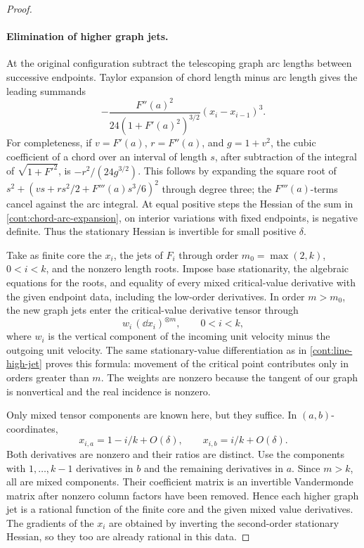 \begin{proof}
\paragraph{Elimination of higher graph jets.}
At the original configuration subtract the telescoping graph
arc lengths between successive endpoints.  Taylor expansion of
chord length minus arc length gives the leading summands
\begin{equation}
 -\frac{F''(a)^2}{24(1+F'(a)^2)^{3/2}}
       (x_i-x_{i-1})^3.
 \label{cont:chord-arc-expansion}
\end{equation}
For completeness, if \(v=F'(a)\), \(r=F''(a)\), and
\(g=1+v^2\), the cubic coefficient of a chord over an interval
of length \(s\), after subtraction of the integral of
\(\sqrt{1+F'^2}\), is \(-r^2/(24g^{3/2})\).
This follows by expanding the square root of
\(s^2+(vs+rs^2/2+F'''(a)s^3/6)^2\) through degree three;
the \(F'''(a)\)-terms cancel against the arc integral.
At equal positive steps the Hessian of the sum in
\eqref{cont:chord-arc-expansion}, on interior variations
with fixed endpoints, is negative definite.  Thus the
stationary Hessian is invertible for small positive \(\delta\).

Take as finite core the \(x_i\), the jets of \(F_i\) through
order \(m_0=\max(2,k)\), \(0<i<k\), and the nonzero length
roots.  Impose base stationarity, the algebraic equations
for the roots, and equality of every mixed critical-value
derivative with the given endpoint data, including the
low-order derivatives.  In order \(m>m_0\), the new graph jets enter
the critical-value derivative tensor through
\begin{equation}
 w_i\,(\dd x_i)^{\otimes m},\qquad 0<i<k,
 \label{cont:point-high-jet}
\end{equation}
where \(w_i\) is the vertical component of the incoming unit
velocity minus the outgoing unit velocity.  The same
stationary-value differentiation as in
\eqref{cont:line-high-jet} proves this formula: movement of
the critical point contributes only in orders greater than
\(m\).  The weights are nonzero because the tangent of our
graph is nonvertical and the real incidence is nonzero.

Only mixed tensor components are known here, but they
suffice.  In \((a,b)\)-coordinates,
\[
 x_{i,a}=1-i/k+O(\delta),\qquad
 x_{i,b}=i/k+O(\delta).
\]
Both derivatives are nonzero and their ratios are distinct.
Use the components with \(1,\ldots,k-1\) derivatives in \(b\)
and the remaining derivatives in \(a\).  Since \(m>k\), all
are mixed components.  Their coefficient matrix is an
invertible Vandermonde matrix after nonzero column factors
have been removed.  Hence each higher graph jet is a
rational function of the finite core and the given mixed
value derivatives.  The gradients of the \(x_i\) are
obtained by inverting the second-order stationary Hessian,
so they too are already rational in this data.


\end{proof}
